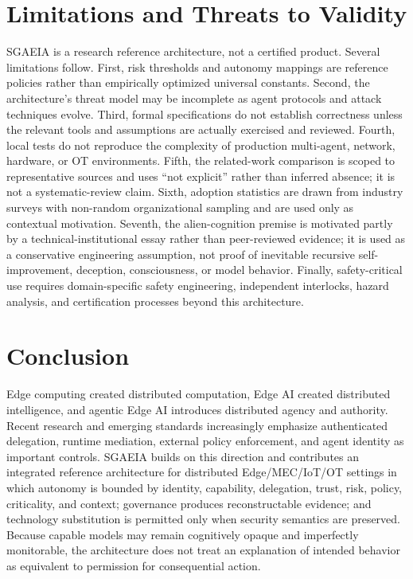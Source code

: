 \documentclass[11pt]{article}
\newcommand{\sgaeia}{\textsc{SGAEIA}}
\begin{document}
\section{Limitations and Threats to Validity}
\sgaeia{} is a research reference architecture, not a certified product. Several limitations follow. First, risk thresholds and autonomy mappings are reference policies rather than empirically optimized universal constants. Second, the architecture's threat model may be incomplete as agent protocols and attack techniques evolve. Third, formal specifications do not establish correctness unless the relevant tools and assumptions are actually exercised and reviewed. Fourth, local tests do not reproduce the complexity of production multi-agent, network, hardware, or OT environments. Fifth, the related-work comparison is scoped to representative sources and uses ``not explicit'' rather than inferred absence; it is not a systematic-review claim. Sixth, adoption statistics are drawn from industry surveys with non-random organizational sampling and are used only as contextual motivation. Seventh, the alien-cognition premise is motivated partly by a technical-institutional essay rather than peer-reviewed evidence; it is used as a conservative engineering assumption, not proof of inevitable recursive self-improvement, deception, consciousness, or model behavior. Finally, safety-critical use requires domain-specific safety engineering, independent interlocks, hazard analysis, and certification processes beyond this architecture.

\section{Conclusion}
Edge computing created distributed computation, Edge AI created distributed intelligence, and agentic Edge AI introduces distributed agency and authority. Recent research and emerging standards increasingly emphasize authenticated delegation, runtime mediation, external policy enforcement, and agent identity as important controls. \sgaeia{} builds on this direction and contributes an integrated reference architecture for distributed Edge/MEC/IoT/OT settings in which autonomy is bounded by identity, capability, delegation, trust, risk, policy, criticality, and context; governance produces reconstructable evidence; and technology substitution is permitted only when security semantics are preserved. Because capable models may remain cognitively opaque and imperfectly monitorable, the architecture does not treat an explanation of intended behavior as equivalent to permission for consequential action.
\end{document}
